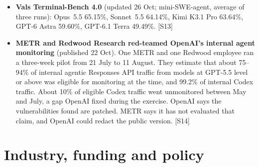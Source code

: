 \documentclass[11pt,a4paper]{article}
\newcommand{\srcref}[1]{\textcolor{brandaccent}{[S#1]}}
\begin{document}
\begin{itemize}
  \item \textbf{Vals Terminal-Bench 4.0} (updated 26 Oct; mini-SWE-agent, average of three runs): Opus~5.5 65.15\%, Sonnet~5.5 64.14\%, Kimi K3.1 Pro
  63.64\%, GPT-6 Astra 59.60\%, GPT-6.1 Terra 49.49\%. \srcref{13}
  \item \textbf{METR and Redwood Research red-teamed OpenAI's internal agent monitoring} (published 22 Oct). One METR and one Redwood employee ran a
  three-week pilot from 21 July to 11 August. They estimate that about 75--94\% of internal agentic Responses API traffic from models at GPT-5.5 level or above was eligible for monitoring at the time,
  and 99.2\% of internal Codex traffic. About 10\% of eligible Codex traffic went unmonitored between May and July, a gap OpenAI fixed during the exercise. OpenAI says the
  vulnerabilities found are patched. METR says it has not evaluated that claim, and OpenAI could redact the public version. \srcref{14}
\end{itemize}

\section{Industry, funding and policy}
\end{document}
